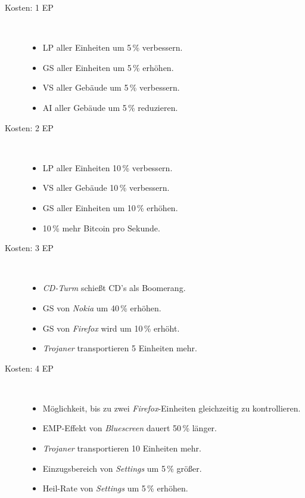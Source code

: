 \begin{description}
  \item[Kosten: 1 EP]~
    \begin{itemize}[nosep]
      \item LP aller Einheiten um 5\,\% verbessern.
      \item GS aller Einheiten um 5\,\% erhöhen.
      \item VS aller Gebäude um 5\,\% verbessern.
      \item AI aller Gebäude um 5\,\% reduzieren.
    \end{itemize}

  \item[Kosten: 2 EP]~
    \begin{itemize}[nosep]
      \item LP aller Einheiten 10\,\% verbessern.
      \item VS aller Gebäude 10\,\% verbessern.
      \item GS aller Einheiten um 10\,\% erhöhen.
      \item 10\,\% mehr Bitcoin pro Sekunde.
    \end{itemize}

  \item[Kosten: 3 EP]~
    \begin{itemize}[nosep]
      \item \emph{CD-Turm} schießt CD's als Boomerang.
	    \item GS von \emph{Nokia} um 40\,\% erhöhen.
	    \item GS von \emph{Firefox} wird um 10\,\% erhöht.
	    \item \emph{Trojaner} transportieren 5 Einheiten mehr.

    \end{itemize}

  \item[Kosten: 4 EP]~
    \begin{itemize}[nosep]
      \item Möglichkeit, bis zu zwei \emph{Firefox}-Einheiten gleichzeitig zu
        kontrollieren.
	    \item EMP-Effekt von \emph{Bluescreen} dauert 50\,\% länger.
	    \item \emph{Trojaner} transportieren 10 Einheiten mehr.
	    \item Einzugsbereich von \emph{Settings} um 5\,\% größer.
	    \item Heil-Rate von \emph{Settings} um 5\,\% erhöhen.


\end{itemize}
\end{description}
